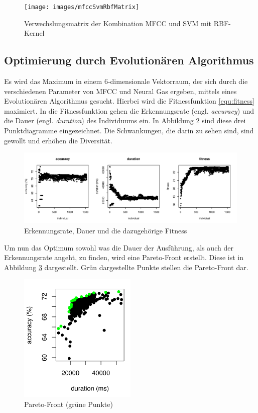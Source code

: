 \begin{figure}[h]
  \centering
  \texttt{[image: images/mfccSvmRbfMatrix]}
  \caption{Verwechslungsmatrix der Kombination MFCC und SVM mit RBF-Kernel}
  \label{fig:verwechslungsmatrixC}
\end{figure}
		
\subsection{Optimierung durch Evolutionären Algorithmus}
Es wird das Maximum in einem 6-dimensionale Vektorraum, der sich durch die verschiedenen Parameter von MFCC und Neural Gas ergeben, mittels eines Evolutionären Algorithmus gesucht. Hierbei wird die Fitnessfunktion \ref{equ:fitness} maximiert. In die Fitnessfunktion gehen die Erkennungsrate (engl. \emph{accuracy}) und die Dauer (engl. \emph{duration}) des Individuums ein. In Abbildung \ref{fig:ea1} sind diese drei Punktdiagramme eingezeichnet. Die Schwankungen, die darin zu sehen sind, sind gewollt und erhöhen die Diversität.

\begin{figure}[h]
	\label{fig:ea1}
	\centering
	\includegraphics[width=1\textwidth]{images/ea1}
	\caption{Erkennungsrate, Dauer und die dazugehörige Fitness}
\end{figure}

Um nun das Optimum sowohl was die Dauer der Ausführung, als auch der Erkennungsrate angeht, zu finden, wird eine Pareto-Front erstellt. Diese ist in Abbildung \ref{fig:ea2} dargestellt. Grün dargestellte Punkte stellen die Pareto-Front dar.

\begin{figure}[h]
	\label{fig:ea2}
	\centering
	\includegraphics[width=0.5\textwidth]{images/ea2}
	\caption{Pareto-Front (grüne Punkte)}
\end{figure}

